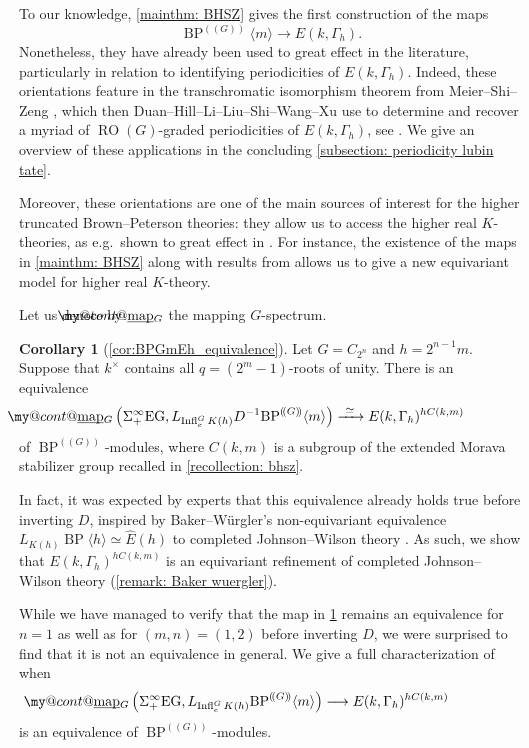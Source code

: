 \documentclass[a4paper, 10pt]{article}
\makeatletter
\newcommand{\BPG}{{\BP^{(\!(G)\!)}}}
\newcommand{\BPGm}{{\BP^{(\!(G)\!)}}\langle m\rangle}
\newcommand{\BP}{\operatorname{BP}}
\newcommand{\RO}{\operatorname{RO}}
\newcommand{\map}{\operatorname{map}}
\newcommand{\Infl}{\operatorname{Infl}}
\DeclareRobustCommand{\myuline}[2][0pt]{%
  \ifmmode
    \uline{\hphantom{#2}\kern-#1}%
    \kern#1%
    \mathllap{\mathpalette\my@cont@{#2}}%
  \else
    \uline{\phantom{#2}\kern-#1}%
    \kern#1%
    \llap{\contour{white}{#2}}%
  \fi
}
\newcommand{\ul}{\myuline}
\newcommand{\my@cont@}[2]{\contour{white}{\mbox{$\m@th#1#2$}}}
\theoremstyle{definition}
\newtheorem{maincor}[maincor]{Corollary}
\makeatother
\begin{document}
To our knowledge, \cref{mainthm: BHSZ} gives the first construction of the maps
\[ \BPGm \longrightarrow E(k, \Gamma_h). \]
Nonetheless, they have already been used to great effect in the literature, particularly in relation to identifying periodicities of $E(k, \Gamma_h)$. Indeed, these orientations feature in the transchromatic isomorphism theorem from Meier--Shi--Zeng \cite{meier2024transchromaticphenomenaequivariantslice}, which then Duan--Hill--Li--Liu--Shi--Wang--Xu use to determine and recover a myriad of $\RO(G)$-graded periodicities of $E(k,\Gamma_h)$, see
\cite{duan2025periodicityfinitecomplexityhigher}. We give an overview of these applications in the concluding \cref{subsection: periodicity lubin tate}.

Moreover, these orientations are one of the main sources of interest for the higher truncated Brown--Peterson theories: they allow us to access the higher real $K$-theories, as e.g.~shown to great effect in \cite{carrick2025higherrealktheoriesfinite}. For instance, the existence of the maps in \cref{mainthm: BHSZ} along with results from \cite{beaudryHillShiZeng2021modelsLubinTate} allows us to give a new equivariant model for higher real $K$-theory. 

Let us denote by $\ul{\map}_G$ the mapping $G$-spectrum.

\begin{maincor}[\cref{cor:BPGmEh_equivalence}] \label{maincor: equivariant equivalence}
    Let $G = C_{2^n}$ and $h = 2^{n-1}m$. Suppose that $k^{\times}$ contains all $q = (2^m-1)$-roots of unity. There is an equivalence
    \[ \ul{\map}_G \left(\Sigma_+^{\infty} \mathrm{EG}, L_{\Infl_e^G K(h)} D^{-1}\BPGm \right) \xrightarrow{\ \simeq \ } E(k,\Gamma_h)^{hC(k,m)} \]
    of $\BPG$-modules, where $C(k,m)$ is a subgroup of the extended Morava stabilizer group recalled in \cref{recollection: bhsz}.
\end{maincor}

In fact, it was expected by experts that this equivalence already holds true before inverting $D$, inspired by Baker--Würgler's non-equivariant equivalence $L_{K(h)} \BP\langle h \rangle \simeq \widehat{E}(h)$ to completed Johnson--Wilson theory \cite[Theorem 4.1]{bakerWuergler1989liftings}. As such, we show that $E(k,\Gamma_h)^{hC(k,m)}$ is an equivariant refinement of completed Johnson--Wilson theory (\cref{remark: Baker wuergler}).

While we have managed to verify that the map in \cref{maincor: equivariant equivalence} remains an equivalence for $n = 1$ as well as for $(m,n) = (1,2)$ before inverting $D$, we were surprised to find that it is not an equivalence in general. We give a full characterization of when
\[ \ul{\map}_G \left(\Sigma_+^{\infty} \mathrm{EG}, L_{\Infl_e^G K(h)} \BPGm \right) \longrightarrow E(k,\Gamma_h)^{hC(k,m)} \]
is an equivalence of $\BPG$-modules.
\end{document}
